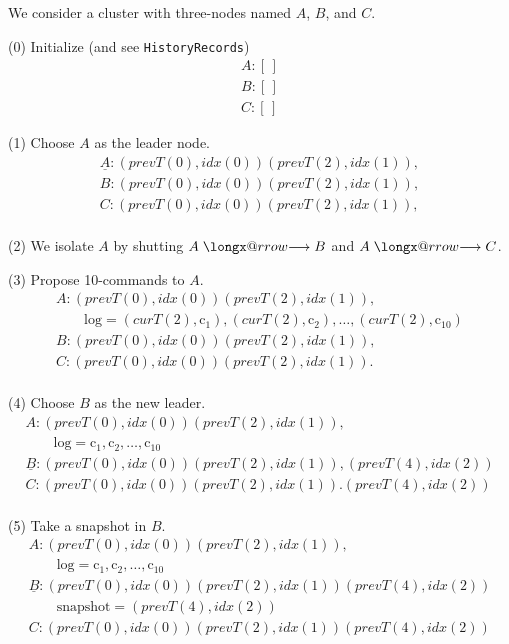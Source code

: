 \documentclass{article}
\makeatletter
\newcommand{\term}[1]{\textit{prevT}(#1)}
\newcommand{\cterm}[1]{\textit{curT}(#1)}
\newcommand{\idx}[1]{\textit{idx}(#1)}
\newcommand{\longxarrow}[1]{%
  \mathrel{\vphantom{\to}\mathpalette\longx@rrow{#1}}%
}
\newcommand{\longx@rrow}[2]{%
  \ooalign{\hidewidth$#1\times\m@th$\hidewidth\cr$#1#2\m@th$\cr}%
}
\newcommand{\longxrightarrow}{\longxarrow{\longrightarrow}}
\makeatother
\begin{document}
We consider a cluster with three-nodes named $A$, $B$, and $C$.

(0) Initialize (and see \verb|HistoryRecords|)
\[
\begin{array}{l}
A: [\,] \\
B: [\,] \\
C: [\,]
\end{array}
\]

(1) Choose $A$ as the leader node.
\[
\begin{array}{l}
\underline{A}: (\term{0}, \idx{0}) (\term{2}, \idx{1}), \\
B: (\term{0}, \idx{0}) (\term{2}, \idx{1}), \\
C: (\term{0}, \idx{0}) (\term{2}, \idx{1}), \\
\end{array}
\]

(2) We isolate $A$ by shutting $A \longxrightarrow B$ and $A \longxrightarrow C$.

(3) Propose 10-commands to $A$.
\[
\begin{array}{l}
A: (\term{0}, \idx{0}) (\term{2}, \idx{1}), \\
\qquad \text{log} = (\cterm{2}, \text{c}_1), (\cterm{2}, \text{c}_2), \ldots, (\cterm{2}, \text{c}_{10}) \\
B: (\term{0}, \idx{0}) (\term{2}, \idx{1}), \\
C: (\term{0}, \idx{0}) (\term{2}, \idx{1}). \\
\end{array}
\]

(4) Choose $B$ as the new leader.
\[
\begin{array}{l}
A: (\term{0}, \idx{0}) (\term{2}, \idx{1}), \\
\qquad \text{log} = \text{c}_1, \text{c}_2, \ldots, \text{c}_{10} \\
\underline{B}: (\term{0}, \idx{0}) (\term{2}, \idx{1}), (\term{4}, \idx{2}) \\
C: (\term{0}, \idx{0}) (\term{2}, \idx{1}). (\term{4}, \idx{2}) \\
\end{array}
\]

(5) Take a snapshot in $B$.
\[
\begin{array}{l}
A: (\term{0}, \idx{0}) (\term{2}, \idx{1}), \\
\qquad \text{log} = \text{c}_1, \text{c}_2, \ldots, \text{c}_{10} \\
\underline{B}: (\term{0}, \idx{0}) (\term{2}, \idx{1}) (\term{4}, \idx{2}) \\
\qquad \text{snapshot} = (\term{4}, \idx{2}) \\
C: (\term{0}, \idx{0}) (\term{2}, \idx{1}) (\term{4}, \idx{2}) \\
\end{array}
\]
\end{document}
